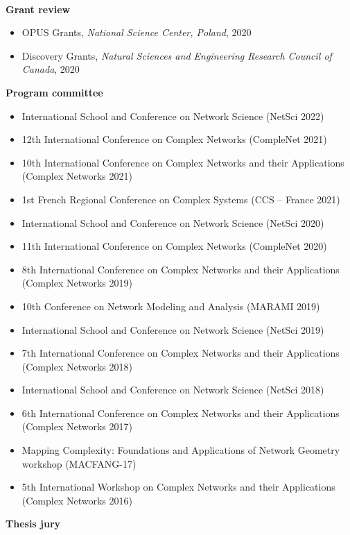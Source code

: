 \documentclass[11pt]{article}
\newcommand{\TitreSection}[1]{\colorbox{background}{\makebox[\textwidth-0.5em][c]{\Large\textrm{\textsc{#1}}}}\vspace{0.75\baselineskip}\\}
\begin{document}
%
%
%
%
%
\TitreSection{Reviewing Activities}
%
\textbf{Grant review}
%
\begin{itemize}
  \item OPUS Grants, \textit{National Science Center, Poland}, 2020
  \item Discovery Grants, \textit{Natural Sciences and Engineering Research Council of Canada}, 2020
\end{itemize}
%
%
%
\textbf{Program committee}
%
\begin{itemize}
  \item International School and Conference on Network Science (NetSci 2022)
  \item 12th International Conference on Complex Networks (CompleNet 2021)
  \item 10th International Conference on Complex Networks and their Applications (Complex Networks 2021)
  \item 1st French Regional Conference on Complex Systems (CCS -- France 2021)
  \item International School and Conference on Network Science (NetSci 2020)
  \item 11th International Conference on Complex Networks (CompleNet 2020)
  \item 8th International Conference on Complex Networks and their Applications (Complex Networks 2019)
  \item 10th Conference on Network Modeling and Analysis (MARAMI 2019)
  \item International School and Conference on Network Science (NetSci 2019)
  \item 7th International Conference on Complex Networks and their Applications (Complex Networks 2018)
  \item International School and Conference on Network Science (NetSci 2018)
  \item 6th International Conference on Complex Networks and their Applications (Complex Networks 2017)
  \item Mapping Complexity: Foundations and Applications of Network Geometry workshop (MACFANG-17)
  \item 5th International Workshop on Complex Networks and their Applications (Complex Networks 2016)
\end{itemize}
%
%
%
\textbf{Thesis jury}
%
\end{document}
